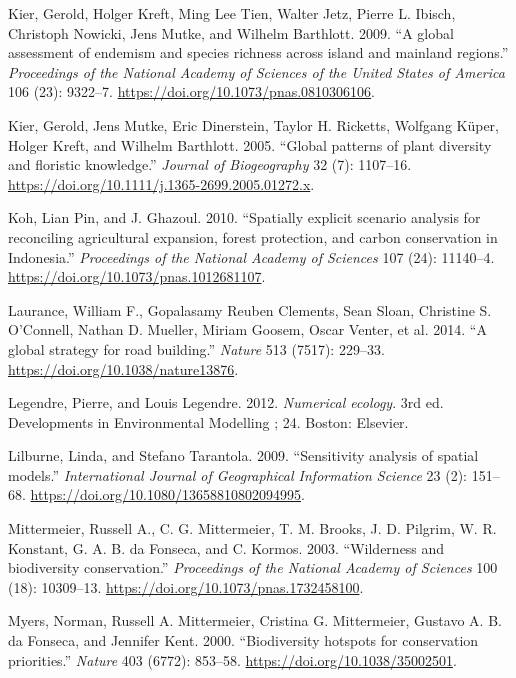 \documentclass[
]{article}
\begin{document}
\leavevmode\hypertarget{ref-Kier2009}{}%
Kier, Gerold, Holger Kreft, Ming Lee Tien, Walter Jetz, Pierre L. Ibisch, Christoph Nowicki, Jens Mutke, and Wilhelm Barthlott. 2009. ``A global assessment of endemism and species richness across island and mainland regions.'' \emph{Proceedings of the National Academy of Sciences of the United States of America} 106 (23): 9322--7. \url{https://doi.org/10.1073/pnas.0810306106}.

\leavevmode\hypertarget{ref-Kier2005}{}%
Kier, Gerold, Jens Mutke, Eric Dinerstein, Taylor H. Ricketts, Wolfgang Küper, Holger Kreft, and Wilhelm Barthlott. 2005. ``Global patterns of plant diversity and floristic knowledge.'' \emph{Journal of Biogeography} 32 (7): 1107--16. \url{https://doi.org/10.1111/j.1365-2699.2005.01272.x}.

\leavevmode\hypertarget{ref-Koh2010a}{}%
Koh, Lian Pin, and J. Ghazoul. 2010. ``Spatially explicit scenario analysis for reconciling agricultural expansion, forest protection, and carbon conservation in Indonesia.'' \emph{Proceedings of the National Academy of Sciences} 107 (24): 11140--4. \url{https://doi.org/10.1073/pnas.1012681107}.

\leavevmode\hypertarget{ref-Laurance2014a}{}%
Laurance, William F., Gopalasamy Reuben Clements, Sean Sloan, Christine S. O'Connell, Nathan D. Mueller, Miriam Goosem, Oscar Venter, et al. 2014. ``A global strategy for road building.'' \emph{Nature} 513 (7517): 229--33. \url{https://doi.org/10.1038/nature13876}.

\leavevmode\hypertarget{ref-Legendre2012}{}%
Legendre, Pierre, and Louis Legendre. 2012. \emph{Numerical ecology}. 3rd ed. Developments in Environmental Modelling ; 24. Boston: Elsevier.

\leavevmode\hypertarget{ref-Lilburne2009}{}%
Lilburne, Linda, and Stefano Tarantola. 2009. ``Sensitivity analysis of spatial models.'' \emph{International Journal of Geographical Information Science} 23 (2): 151--68. \url{https://doi.org/10.1080/13658810802094995}.

\leavevmode\hypertarget{ref-Mittermeier2003}{}%
Mittermeier, Russell A., C. G. Mittermeier, T. M. Brooks, J. D. Pilgrim, W. R. Konstant, G. A. B. da Fonseca, and C. Kormos. 2003. ``Wilderness and biodiversity conservation.'' \emph{Proceedings of the National Academy of Sciences} 100 (18): 10309--13. \url{https://doi.org/10.1073/pnas.1732458100}.

\leavevmode\hypertarget{ref-Myers2000}{}%
Myers, Norman, Russell A. Mittermeier, Cristina G. Mittermeier, Gustavo A. B. da Fonseca, and Jennifer Kent. 2000. ``Biodiversity hotspots for conservation priorities.'' \emph{Nature} 403 (6772): 853--58. \url{https://doi.org/10.1038/35002501}.
\end{document}
